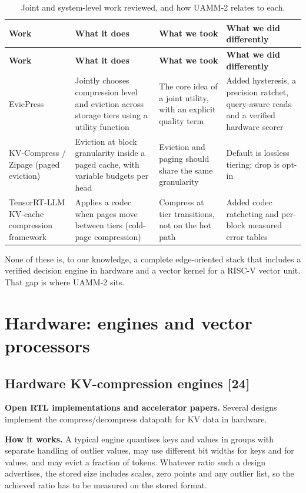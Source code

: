 \documentclass[12pt,a4paper]{report}
\begin{document}
{\fontsize{8}{9.5}\selectfont\setlength{\tabcolsep}{3pt}
\begin{longtable}{>{\raggedright\arraybackslash}p{1.16in}>{\raggedright\arraybackslash}p{1.69in}>{\raggedright\arraybackslash}p{1.51in}>{\raggedright\arraybackslash}p{1.51in}}
\caption{Joint and system-level work reviewed, and how UAMM-2 relates to each.}\\
\toprule
\textbf{Work} & \textbf{What it does} & \textbf{What we took} & \textbf{What we did differently} \\\midrule\endfirsthead
\toprule \textbf{Work} & \textbf{What it does} & \textbf{What we took} & \textbf{What we did differently} \\\midrule\endhead
\bottomrule\endfoot
EvicPress & Jointly chooses compression level and eviction across storage tiers using a utility function & The core idea of a joint utility, with an explicit quality term & Added hysteresis, a precision ratchet, query-aware reads and a verified hardware scorer \\
KV-Compress / Zipage (paged eviction) & Eviction at block granularity inside a paged cache, with variable budgets per head & Eviction and paging should share the same granularity & Default is lossless tiering; drop is opt-in \\
TensorRT-LLM KV-cache compression framework & Applies a codec when pages move between tiers (cold-page compression) & Compress at tier transitions, not on the hot path & Added codec ratcheting and per-block measured error tables \\
\bottomrule
\end{longtable}}
None of these is, to our knowledge, a complete edge-oriented stack that includes a verified decision engine in hardware and a vector kernel for a RISC-V vector unit. That gap is where UAMM-2 sits.

\section{Hardware: engines and vector processors}\label{sec:2_10}
\subsection{Hardware KV-compression engines [24]}
\textbf{Open RTL implementations and accelerator papers.} Several designs implement the compress/decompress datapath for KV data in hardware.

\textbf{How it works.} A typical engine quantises keys and values in groups with separate handling of outlier values, may use different bit widths for keys and for values, and may evict a fraction of tokens. Whatever ratio such a design advertises, the stored size includes scales, zero points and any outlier list, so the achieved ratio has to be measured on the stored format.
\end{document}
